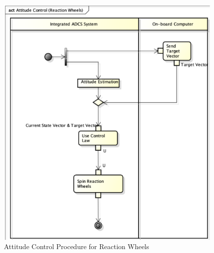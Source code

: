 \documentclass[conf]{new-aiaa}
\begin{document}
\begin{figure}[H]
\centering
\includegraphics[width=1.0\textwidth]{Figures/AC_RW_AD.png}
\caption{Attitude Control Procedure for Reaction Wheels}
\label{fig:AC_RW_AD}
\end{figure}
\end{document}
